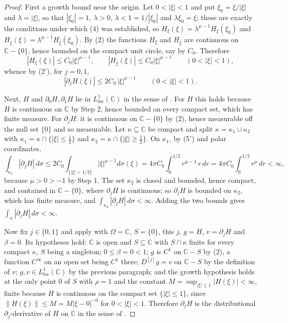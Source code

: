 \begin{proof}
First a growth bound near the origin.  Let $0<|\xi|<1$ and put
$\xi_0=\xi/|\xi|$ and $\lambda=|\xi|$, so that $|\xi_0|=1$, $\lambda>0$,
$\lambda<1=1/|\xi_0|$ and $\lambda\xi_0=\xi$; these are exactly the conditions
under which (4) was established, so
$H_\xi(\xi)=\lambda^{\mu-1}H_\xi(\xi_0)$ and
$H_{\bar\xi}(\xi)=\lambda^{\mu-1}H_{\bar\xi}(\xi_0)$.  By (2) the functions
$H_\xi$ and $H_{\bar\xi}$ are continuous on $\mathbb{C}-\{0\}$, hence bounded
on the compact unit circle, say by $C_0$.  Therefore
\[
  |H_\xi(\xi)|\le C_0|\xi|^{\mu-1},\qquad
  |H_{\bar\xi}(\xi)|\le C_0|\xi|^{\mu-1}\qquad(0<|\xi|<1),
\]
whence by (2$'$), for $j=0,1$,
\begin{equation}\tag{5$'$}
  |\partial_jH(\xi)|\le 2C_0\,|\xi|^{\mu-1}\qquad(0<|\xi|<1).
\end{equation}

Next, $H$ and $\partial_0H,\partial_1H$ lie in
$L^1_{\mathrm{loc}}(\mathbb{C})$ in the sense of .  For $H$
this holds because $H$ is continuous on $\mathbb{C}$ by Step 2, hence bounded
on every compact set, which has finite measure.  For $\partial_jH$:  it is
continuous on $\mathbb{C}-\{0\}$ by (2), hence measurable off the null set
$\{0\}$ and so measurable.  Let $\kappa\subseteq\mathbb{C}$ be compact and
split $\kappa=\kappa_1\cup\kappa_2$ with
$\kappa_1=\kappa\cap\{|\xi|\le\tfrac12\}$ and
$\kappa_2=\kappa\cap\{|\xi|\ge\tfrac12\}$.  On $\kappa_1$, by (5$'$) and polar
coordinates,
\[
  \int_{\kappa_1}|\partial_jH|\,d\sigma
  \le 2C_0\int_{\{|\xi|<1/2\}}|\xi|^{\mu-1}d\sigma(\xi)
  =4\pi C_0\int_0^{1/2}r^{\mu-1}\,r\,dr
  =4\pi C_0\int_0^{1/2}r^{\mu}\,dr<\infty,
\]
because $\mu>0>-1$ by Step 1.  The set $\kappa_2$ is closed and bounded, hence
compact, and contained in $\mathbb{C}-\{0\}$, where $\partial_jH$ is
continuous; so $\partial_jH$ is bounded on $\kappa_2$, which has finite
measure, and $\int_{\kappa_2}|\partial_jH|\,d\sigma<\infty$.  Adding the two
bounds gives $\int_\kappa|\partial_jH|\,d\sigma<\infty$.

Now fix $j\in\{0,1\}$ and apply  with
$\Omega=\mathbb{C}$, $S=\{0\}$, this $j$, $g=H$, $v=\partial_jH$ and
$\beta=0$.  Its hypotheses hold: $\mathbb{C}$ is open and $S\subseteq\mathbb{C}$
with $S\cap\kappa$ finite for every compact $\kappa$, $S$ being a singleton;
$0\le\beta=0<1$; $g$ is $C^1$ on $\mathbb{C}-S$ by (2), a function $C^\infty$
on an open set being $C^1$ there; $D^{[j]}g=v$ on
$\mathbb{C}-S$ by the definition of $v$; $g,v\in L^1_{\mathrm{loc}}(\mathbb{C})$
by the previous paragraph; and the growth hypothesis holds at the only point
$0$ of $S$ with $\rho=1$ and the constant
$M=\sup_{|\xi|\le1}|H(\xi)|<\infty$, finite because $H$ is continuous on the
compact set $\{|\xi|\le1\}$, since $\|H(\xi)\|\le M=M|\xi-0|^{-0}$ for
$0<|\xi|<1$.  Therefore $\partial_jH$ is the distributional
$\partial_j$-derivative of $H$ on $\mathbb{C}$ in the sense of
.


\end{proof}
